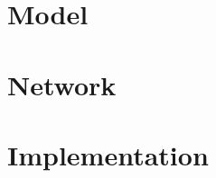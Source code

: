 \section{Model}
\label{sec:methods_model}


\section{Network}
\label{sec:methods_network}


\section{Implementation}
\label{sec:methods_implementation}



